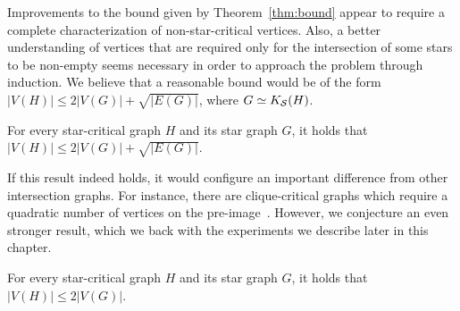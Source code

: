 Improvements to the bound given by Theorem~\ref{thm:bound} appear to require a complete characterization of non-star-critical vertices.
Also, a better understanding of vertices that are required only for the intersection of some stars to be non-empty seems necessary in order to approach the problem through induction.
We believe that a reasonable bound would be of the form $|V(H)| \leq 2|V(G)| + \sqrt{|E(G)|}$, where $G \simeq K_{\mathcal{S}}(H)$.

\begin{conjecture}
    For every star-critical graph $H$ and its star graph $G$, it holds that $|V(H)| \leq 2|V(G)| + \sqrt{|E(G)|}$.
\end{conjecture}

If this result indeed holds, it would configure an important difference from other intersection graphs.
For instance, there are clique-critical graphs which require a quadratic number of vertices on the pre-image~\cite{clique_critical_alcon}.
However, we conjecture an even stronger result, which we back with the experiments we describe later in this chapter.

\begin{conjecture}
	For every star-critical graph $H$ and its star graph $G$, it holds that $|V(H)| \leq 2|V(G)|$.
\end{conjecture}